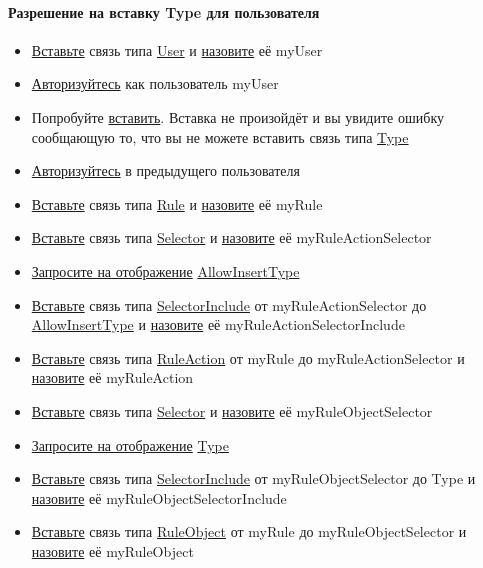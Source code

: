 \paragraph{Разрешение на вставку Type для пользователя}
\begin{itemize}
  \item \hyperlink{DeepCase.InsertLink.Description}{Вставьте} связь типа
  \hyperlink{Core.User.Description}{User} и
  \hyperlink{FAQ.HowToSetName}{назовите} её myUser
  \item \hyperlink{DeepCase.Login.Description}{Авторизуйтесь} как пользователь myUser
  \item Попробуйте \hyperlink{DeepCase.InsertLink.Description}{вставить}. Вставка не произойдёт и вы увидите ошибку сообщающую то, что вы не можете вставить связь типа \hyperlink{Core.Type.Description}{Type}
  \item \hyperlink{DeepCase.Login.Description}{Авторизуйтесь} в предыдущего пользователя
  \item \hyperlink{DeepCase.InsertLink.Description}{Вставьте} связь типа
  \hyperlink{Core.Rule.Description}{Rule} и
  \hyperlink{FAQ.HowToSetName}{назовите} её myRule

  \item \hyperlink{DeepCase.InsertLink.Description}{Вставьте} связь типа
  \hyperlink{Core.Selector.Description}{Selector} и
  \hyperlink{FAQ.HowToSetName}{назовите} её myRuleActionSelector
  \item \hyperlink{Core.Query.Description}{Запросите на отображение} \hyperlink{Core.AllowInsertType.Description}{AllowInsertType}
  \item \hyperlink{DeepCase.InsertLink.Description}{Вставьте} связь типа \hyperlink{Core.SelectorInclude.Description}{SelectorInclude} от myRuleActionSelector до \hyperlink{Core.AllowInsertType.Description}{AllowInsertType} и
  \hyperlink{FAQ.HowToSetName}{назовите} её myRuleActionSelectorInclude
  \item \hyperlink{DeepCase.InsertLink.Description}{Вставьте} связь типа
  \hyperlink{Core.RuleAction.Description}{RuleAction} от myRule до myRuleActionSelector и
  \hyperlink{FAQ.HowToSetName}{назовите} её myRuleAction

  \item \hyperlink{DeepCase.InsertLink.Description}{Вставьте} связь типа
  \hyperlink{Core.Selector.Description}{Selector} и
  \hyperlink{FAQ.HowToSetName}{назовите} её myRuleObjectSelector
  \item \hyperlink{Core.Query.Description}{Запросите на отображение} \hyperlink{Core.Type.Description}{Type}
  \item \hyperlink{DeepCase.InsertLink.Description}{Вставьте} связь типа \hyperlink{Core.SelectorInclude.Description}{SelectorInclude} от myRuleObjectSelector до Type и
  \hyperlink{FAQ.HowToSetName}{назовите} её myRuleObjectSelectorInclude
  \item \hyperlink{DeepCase.InsertLink.Description}{Вставьте} связь типа
  \hyperlink{Core.RuleObject.Description}{RuleObject} от myRule до myRuleObjectSelector и
  \hyperlink{FAQ.HowToSetName}{назовите} её myRuleObject


\end{itemize}
